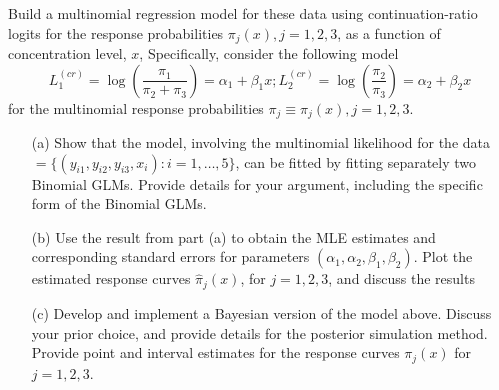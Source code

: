 \documentclass[]{article}
\begin{document}
\begin{enumerate}
{\begin{table}[ht!]
		\end{table}
		Build a multinomial regression model for these data using continuation-ratio logits for the response probabilities $\pi_j(x), j = 1,2,3$, as a function of concentration level, $x$, Specifically, consider the following model 
		$$L_1^{(cr)} = \log(\frac{\pi_1}{\pi_2+\pi_3}) = \alpha_1 + \beta_1 x; L_2^{(cr)} = \log(\frac{\pi_2}{\pi_3}) = \alpha_2 + \beta_2 x$$
		for the multinomial response probabilities $\pi_j \equiv \pi_j(x), j = 1,2,3$.
		\begin{itemize}
			\item[(a)] Show that the model, involving the multinomial likelihood for the data $= \{(y_{i1}, y_{i2}, y_{i3}, x_i) : i = 1,\ldots,5\}$, can be fitted by fitting separately two Binomial GLMs. Provide details for your argument, including the specific form of the Binomial GLMs.
			\item[(b)] Use the result from part (a) to obtain the MLE estimates and corresponding standard errors for parameters $(\alpha_1, \alpha_2, \beta_1, \beta_2)$. Plot the estimated response curves $\hat{\pi}_j(x)$, for $j = 1,2,3$, and discuss the results
			\item[(c)] Develop and implement a Bayesian version of the model above. Discuss your prior choice, and provide details for the posterior simulation method. Provide point and interval estimates for the response curves $\pi_j(x)$ for $j = 1,2,3$.
		\end{itemize}
		
}
\end{enumerate}
\end{document}
